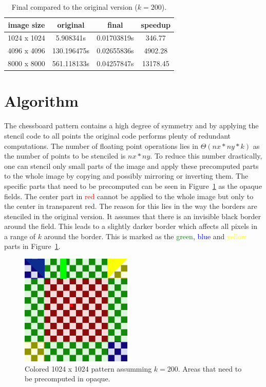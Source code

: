 \documentclass[letterpaper,twocolumn,10pt]{article}
\begin{document}
\begin{table}[ht]
	\caption{Final compared to the original version ($k=200$).}
	\begin{tabular}{c c c c}
		 image size & original & final & speedup \\
		 \hline
		1024 x 1024 & 5.908341s   & 0.01703819s & 346.77 \\
		4096 x 4096 & 130.196475s & 0.02655836s & 4902.28\\
		8000 x 8000 & 561.118133s & 0.04257847s & 13178.45\\
	\end{tabular}
	\label{tab:final}
\end{table}

\section*{Algorithm}
The chessboard pattern contains a high degree of symmetry and by applying the stencil code
to all points the original code performs plenty of redundant computations.
The number of floating point operations lies in $\Theta(nx * ny * k)$
as the number of points to be stenciled is $nx * ny$.
To reduce this number drastically, one can stencil only small parts of the image and apply
these precomputed parts to the whole image by copying and possibly mirroring or inverting them.
The specific parts that need to be precomputed can be seen
in Figure~\ref{fig:board} as the opaque fields. The center part in \textcolor{red}{red} cannot
be applied to the whole image but only to the center in transparent red.
The reason for this lies in the way the borders are stenciled in the original version. It assumes
that there is an invisible black border around the field. This leads to a slightly darker border
which affects all pixels in a range of $k$ around the border. This is marked as the
\textcolor{green}{green}, \textcolor{blue}{blue} and \textcolor{yellow}{yellow} parts in Figure~\ref{fig:board}.

\begin{figure}[t]
	\begin{center}
	\includegraphics[width=150pt]{res/stencil_colored_with_prec}
	\caption{Colored 1024 x 1024 pattern assumming $k = 200$. Areas that need to be precomputed in opaque.}
	\label{fig:board}
	\end{center}
\end{figure}
\end{document}
